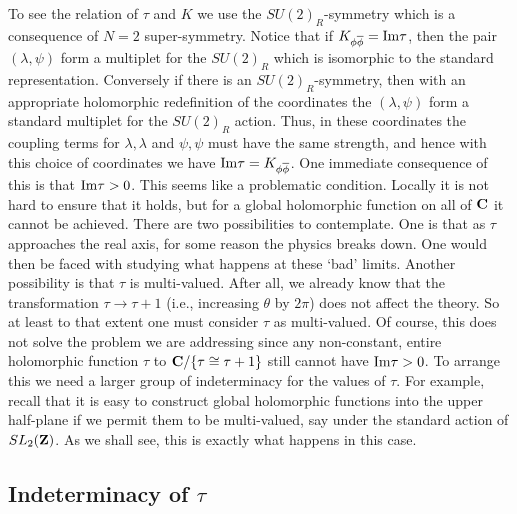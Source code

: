 \documentclass[10pt]{article}
\begin{document}
To see the relation of $\tau$ and $K$ we use the  $SU(2)_R$-symmetry
which is a consequence of $N=2$ super-symmetry. 
Notice that if $K_{\phi\overline\phi}={\rm Im}\tau$, then 
the pair
$(\lambda,\psi)$ form a multiplet for the $SU(2)_R$ which is
isomorphic
to the  standard representation. 
Conversely if there is an $SU(2)_R$-symmetry, then with an 
appropriate holomorphic redefinition of the
coordinates the $(\lambda,\psi)$ form a standard multiplet for the
$SU(2)_R$ action.  Thus, in these coordinates the 
coupling terms for $\lambda,\lambda$ and $\psi,\psi$ must have the
same strength, and hence with this choice of coordinates we have
${\rm
Im}\tau=K_{\phi\overline\phi}$.
One immediate consequence of this is that ${\rm Im}\tau>0$. This seems
like a problematic condition.  Locally it is not hard to ensure that
it holds, but for a global holomorphic function on all of ${\bf C}$ it
cannot  be achieved. There are two possibilities to contemplate.  One
is that as $\tau$ approaches the real axis,  for some reason
the physics breaks down. One would then be faced with studying what
happens at these `bad' limits.  Another possibility is that $\tau$ is
multi-valued. 
After all, we already know that the transformation $\tau\to \tau +1$
(i.e., increasing $\theta$ by $2\pi$) does not affect the theory.
So at least to that extent one must consider $\tau$ as multi-valued.  Of
course, this does not solve the problem we are addressing since any
non-constant, entire holomorphic function $\tau$ to ${\bf
C}/\{\tau\cong\tau+1\}$ 
still cannot have ${\rm Im}\tau>0$.
To arrange this we need a larger group of indeterminacy for the values
of $\tau$.  
For example, recall that it is easy to construct global holomorphic
functions into 
the upper half-plane if we permit them to be multi-valued, say under
the standard action of
$SL_2({\bf Z})$. As we shall see, this is exactly what happens in this
case. 

\subsection{Indeterminacy of $\tau$}
\end{document}
